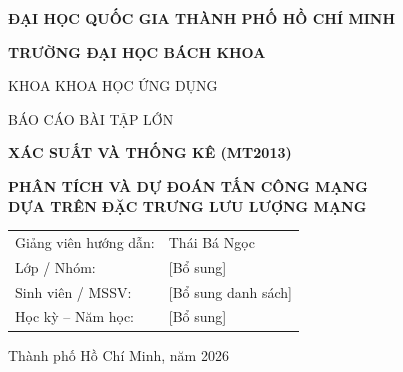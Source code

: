 \begin{titlepage}
\centering
{\bfseries\large ĐẠI HỌC QUỐC GIA THÀNH PHỐ HỒ CHÍ MINH\par}
{\bfseries\large TRƯỜNG ĐẠI HỌC BÁCH KHOA\par}
\vspace{1cm}
{\large KHOA KHOA HỌC ỨNG DỤNG\par}
\vspace{2cm}
{\large BÁO CÁO BÀI TẬP LỚN\par}
\vspace{0.6cm}
{\Large\bfseries XÁC SUẤT VÀ THỐNG KÊ (MT2013)\par}
\vspace{1.5cm}
{\Large\bfseries PHÂN TÍCH VÀ DỰ ĐOÁN TẤN CÔNG MẠNG\\
DỰA TRÊN ĐẶC TRƯNG LƯU LƯỢNG MẠNG\par}
\vspace{2cm}
\begin{tabular}{ll}
Giảng viên hướng dẫn: & Thái Bá Ngọc\\
Lớp / Nhóm: & [Bổ sung]\\
Sinh viên / MSSV: & [Bổ sung danh sách]\\
Học kỳ -- Năm học: & [Bổ sung]
\end{tabular}
\vfill
Thành phố Hồ Chí Minh, năm 2026
\end{titlepage}

